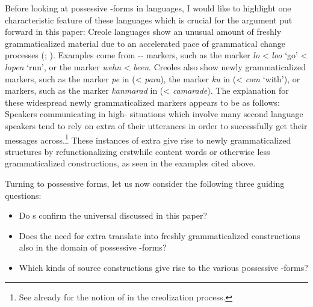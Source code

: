 \documentclass[output=paper]{langsci/langscibook}
\begin{document}
Before looking at possessive -forms in  languages, I would like to highlight one characteristic feature of these languages which is crucial for the argument put forward in this paper: Creole languages show an unusual amount of freshly grammaticalized material due to an accelerated pace of grammatical change processes (\citealt{HaspelmathMichaelis2017}; \citealt{MichaelisHaspelmath2018}). Examples come from -- markers, such as the    marker \textit{lo} < \textit{loo} ‘go’ <  \textit{lopen} ‘run’, or the   marker \textit{wehn} <  \textit{been}. Creoles also show newly grammaticalized  markers, such as the  marker \textit{pe} in  (<  \textit{para}), the  marker \textit{ku} in  (<  \textit{com} ‘with’), or  markers, such as the  marker \textit{kanmarad} in  (<  \textit{camarade}). The explanation for these widespread newly grammaticalized markers appears to be as follows: Speakers communicating in high- situations which involve many second language speakers tend to rely on extra  of their utterances in order to successfully get their messages across.\footnote{See already \citet{SeurenWekker1986} for the notion of  in the creolization process.} These instances of extra  give rise to newly grammaticalized structures by refunctionalizing erstwhile content words or otherwise less grammaticalized constructions, as seen in the examples cited above.

Turning to possessive forms, let us now consider the following three guiding questions: 
\begin{itemize}
\item Do s confirm the universal  discussed in this paper?
\item Does the need for extra  translate into freshly grammaticalized constructions also in the domain of possessive -forms?
\item Which kinds of source constructions give rise to the various possessive -forms?
\end{itemize}
\end{document}
